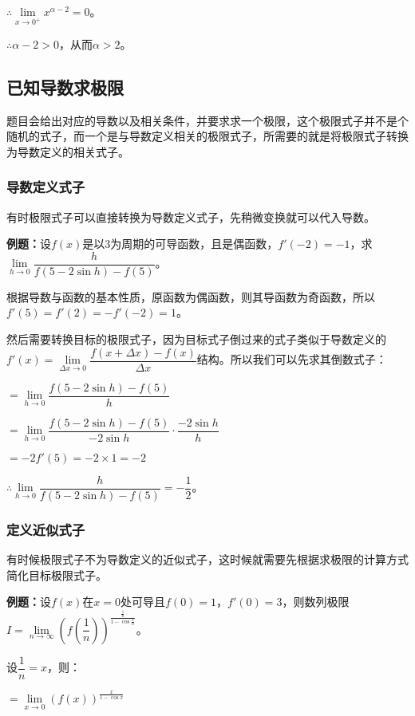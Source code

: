 \documentclass[UTF8, 12pt]{ctexart}
\begin{document}
$\therefore\lim\limits_{x\to 0^+}x^{\alpha-2}=0$。

$\therefore\alpha-2>0$，从而$\alpha>2$。

\subsection{已知导数求极限}

题目会给出对应的导数以及相关条件，并要求求一个极限，这个极限式子并不是个随机的式子，而一个是与导数定义相关的极限式子，所需要的就是将极限式子转换为导数定义的相关式子。

\subsubsection{导数定义式子}

有时极限式子可以直接转换为导数定义式子，先稍微变换就可以代入导数。

\textbf{例题：}设$f(x)$是以3为周期的可导函数，且是偶函数，$f'(-2)=-1$，求$\lim\limits_{h\to 0}\dfrac{h}{f(5-2\sin h)-f(5)}$。\medskip

根据导数与函数的基本性质，原函数为偶函数，则其导函数为奇函数，所以$f'(5)=f'(2)=-f'(-2)=1$。

然后需要转换目标的极限式子，因为目标式子倒过来的式子类似于导数定义的$f'(x)=\lim\limits_{\Delta x\to 0}\dfrac{f(x+\Delta x)-f(x)}{\Delta x}$结构。所以我们可以先求其倒数式子：\medskip

$=\lim\limits_{h\to 0}\dfrac{f(5-2\sin h)-f(5)}{h}$

$=\lim\limits_{h\to 0}\dfrac{f(5-2\sin h)-f(5)}{-2\sin h}\cdot\dfrac{-2\sin h}{h}$

$=-2f'(5)=-2\times 1=-2$

$\therefore\lim\limits_{h\to 0}\dfrac{h}{f(5-2\sin h)-f(5)}=-\dfrac{1}{2}$。

\subsubsection{定义近似式子}

有时候极限式子不为导数定义的近似式子，这时候就需要先根据求极限的计算方式简化目标极限式子。

\textbf{例题：}设$f(x)$在$x=0$处可导且$f(0)=1$，$f'(0)=3$，则数列极限$I=\lim\limits_{n\to\infty}\left(f\left(\dfrac{1}{n}\right)\right)^{\frac{\frac{1}{n}}{1-\cos\frac{1}{n}}}$。\medskip

设$\dfrac{1}{n}=x$，则：

$=\lim\limits_{x\to 0}(f(x))^{\frac{x}{1-\cos x}}$
\end{document}
